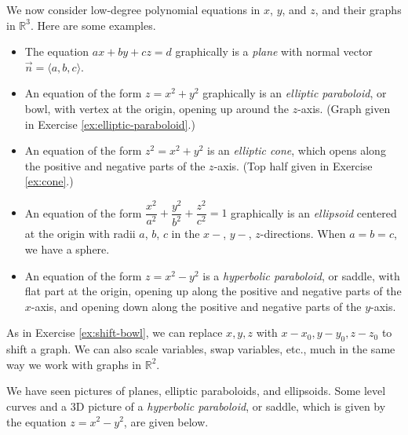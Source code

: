 We now consider low-degree polynomial equations in $x$, $y$, and $z$, and their graphs in $\mathbb{R}^3$. Here are some examples.
\begin{itemize}
    \item The equation $ax+by+cz=d$ graphically is a \emph{plane} with normal vector $\vec{n}=\langle a,b,c\rangle$.
    \item An equation of the form $z=x^2+y^2$ graphically is an \emph{elliptic paraboloid}, or bowl, with vertex at the origin, opening up around the $z$-axis. (Graph given in Exercise \ref{ex:elliptic-paraboloid}.)
    \item An equation of the form $z^2=x^2+y^2$ is an \emph{elliptic cone}, which opens along the positive and negative parts of the $z$-axis. (Top half given in Exercise \ref{ex:cone}.)
    \item An equation of the form $\dfrac{x^2}{a^2}+\dfrac{y^2}{b^2}+\dfrac{z^2}{c^2}=1$ graphically is an \emph{ellipsoid} centered at the origin with radii $a$, $b$, $c$ in the $x-$, $y-$, $z$-directions. When $a=b=c$, we have a sphere.
    \item An equation of the form $z=x^2-y^2$ is a \emph{hyperbolic paraboloid}, or saddle, with flat part at the origin, opening up along the positive and negative parts of the $x$-axis, and opening down along the positive and negative parts of the $y$-axis.
\end{itemize}
As in Exercise \ref{ex:shift-bowl}, we can replace $x,y,z$ with $x-x_0,y-y_0,z-z_0$ to shift a graph. We can also scale variables, swap variables, etc., much in the same way we work with graphs in $\mathbb{R}^2$.

\vfill 

We have seen pictures of planes, elliptic paraboloids, and ellipsoids. Some level curves and a 3D picture of a \emph{hyperbolic paraboloid}, or saddle, which is given by the equation $z=x^2-y^2$, are given below.

